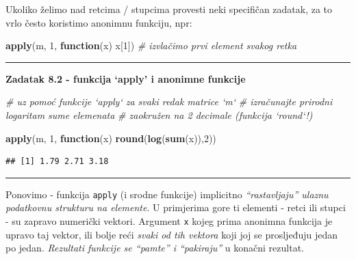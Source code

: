 \documentclass[]{book}
\newenvironment{Shaded}{\begin{snugshade}}{\end{snugshade}}
\newcommand{\KeywordTok}[1]{\textcolor[rgb]{0.13,0.29,0.53}{\textbf{#1}}}
\newcommand{\DecValTok}[1]{\textcolor[rgb]{0.00,0.00,0.81}{#1}}
\newcommand{\CommentTok}[1]{\textcolor[rgb]{0.56,0.35,0.01}{\textit{#1}}}
\newcommand{\ControlFlowTok}[1]{\textcolor[rgb]{0.13,0.29,0.53}{\textbf{#1}}}
\newcommand{\NormalTok}[1]{#1}
\theoremstyle{definition}
\theoremstyle{definition}
\theoremstyle{definition}
\theoremstyle{remark}
\begin{document}
Ukoliko želimo nad retcima / stupcima provesti neki specifičan zadatak,
za to vrlo često koristimo anonimnu funkciju, npr:

\begin{Shaded}
\begin{Highlighting}[]
\KeywordTok{apply}\NormalTok{(m, }\DecValTok{1}\NormalTok{, }\ControlFlowTok{function}\NormalTok{(x) x[}\DecValTok{1}\NormalTok{])   }\CommentTok{# izvlačimo prvi element svakog retka}
\end{Highlighting}
\end{Shaded}

\begin{center}\rule{0.5\linewidth}{\linethickness}\end{center}

\textbf{Zadatak 8.2 - funkcija `apply' i anonimne funkcije}

\begin{Shaded}
\begin{Highlighting}[]
\CommentTok{# uz pomoć funkcije `apply` za svaki redak matrice `m` }
\CommentTok{# izračunajte prirodni logaritam sume elemenata}
\CommentTok{# zaokružen na 2 decimale  (funkcija `round`!)}
\end{Highlighting}
\end{Shaded}

\begin{Shaded}
\begin{Highlighting}[]
\KeywordTok{apply}\NormalTok{(m, }\DecValTok{1}\NormalTok{, }\ControlFlowTok{function}\NormalTok{(x) }\KeywordTok{round}\NormalTok{(}\KeywordTok{log}\NormalTok{(}\KeywordTok{sum}\NormalTok{(x)),}\DecValTok{2}\NormalTok{))}
\end{Highlighting}
\end{Shaded}

\begin{verbatim}
## [1] 1.79 2.71 3.18
\end{verbatim}

\begin{center}\rule{0.5\linewidth}{\linethickness}\end{center}

Ponovimo - funkcija \texttt{apply} (i srodne funkcije) implicitno
\emph{``rastavljaju'' ulaznu podatkovnu strukturu na elemente}. U
primjerima gore ti elementi - retci ili stupci - su zapravo numerički
vektori. Argument \texttt{x} kojeg prima anonimna funkcija je upravo taj
vektor, ili bolje reći \emph{svaki od tih vektora} koji joj se
prosljeđuju jedan po jedan. \emph{Rezultati funkcije se ``pamte'' i
``pakiraju''} u konačni rezultat.
\end{document}
